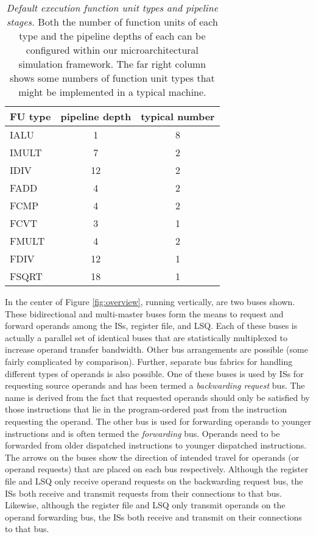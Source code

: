 \documentclass[10pt,dvips]{article}
\begin{document}
\begin{table}[p]
\begin{center}
\caption{{\em Default execution function unit types and pipeline stages.}
Both the number of function units of each type and the pipeline depths 
of each
can be configured within our microarchitectural simulation framework.
The far right column shows some numbers of function unit
types that might be implemented in a typical machine.}
\label{tab:futypes}
\vspace{+0.1in}
\begin{tabular}{|l|c|c|}
\hline 
FU type&pipeline depth&typical number\\
\hline
IALU&1&8\\
\hline
IMULT&7&2\\
\hline
IDIV&12&2\\
\hline
FADD&4&2\\
\hline
FCMP&4&2\\
\hline
FCVT&3&1\\
\hline
FMULT&4&2\\
\hline
FDIV&12&1\\
\hline
FSQRT&18&1\\
\hline
\end{tabular}
\end{center}
\end{table}
%
%

In the center of Figure \ref{fig:overview},
running vertically, are two buses shown.
These bidirectional and multi-master buses 
form the means to request and forward operands
among the ISs, register file, and LSQ.
Each of these buses is actually a parallel set of identical buses
that are statistically multiplexed to increase operand transfer
bandwidth.  
Other bus arrangements are possible (some fairly complicated by
comparison).  
Further, separate bus fabrics for handling
different types of operands is also possible.
One of these buses is used by ISs
for requesting source operands and
has been termed a \textit{backwarding request} bus.
The name is derived from the fact that requested operands should
only be satisfied by those instructions that lie in the program-ordered
past from the instruction requesting the operand.
The other bus is used for forwarding operands to younger instructions
and is often termed the \textit{forwarding} bus.
Operands need to be forwarded from older dispatched
instructions to younger dispatched instructions.
The arrows on the buses show the direction of intended travel
for operands (or operand requests) that are placed on each bus
respectively.  Although the register file and LSQ only receive
operand requests on the backwarding request bus, the ISs
both receive and transmit requests from their connections to that
bus.  Likewise, although the register file and LSQ only transmit
operands on the operand forwarding bus, the ISs
both receive and transmit on their connections to that bus.
\end{document}

